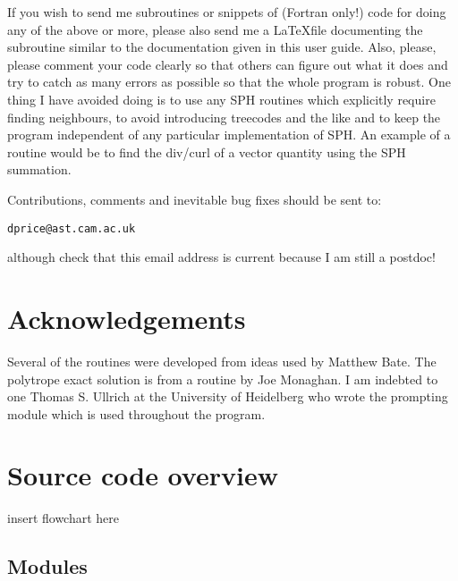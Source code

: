 \documentclass[a4paper,12pt]{article}
\begin{document}
If you wish to send me subroutines or snippets of (Fortran only!) code for doing any of the above or
more, please also send me a \LaTeX file
documenting the subroutine similar to the documentation given in this user guide.
Also, please, please comment your code clearly so that others can figure out
what it does and try to catch as many errors as possible so that the whole
program is robust.  One thing I have avoided doing is to use any SPH
routines which explicitly require finding neighbours, to avoid introducing treecodes and
the like and to keep the program independent of any particular implementation of
SPH. An example of a
routine would be to find the div/curl of a vector quantity using
the SPH summation.

Contributions, comments and inevitable bug fixes
should be sent to:
\begin{verbatim}
dprice@ast.cam.ac.uk
\end{verbatim}
although check that this email address is current because I am still a postdoc!


\section*{Acknowledgements}
 Several of the routines were developed from ideas used by Matthew Bate. The
polytrope exact solution is from a routine by Joe Monaghan. I am indebted to one
Thomas S. Ullrich at the University of Heidelberg who wrote the prompting module
which is used throughout the program.

\newpage
\appendix


\section{Source code overview}
 insert flowchart here

\subsection{Modules}
\end{document}
